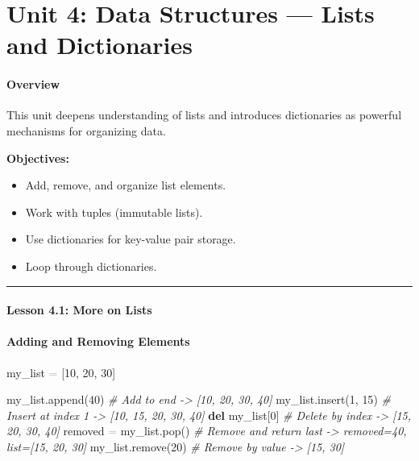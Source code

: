 \documentclass[
  justified,
  openright,
]{tufte-book}
\let\subsection\paragraph
\let\paragraph\paragraph
\newcommand{\KeywordTok}[1]{\textcolor{CodeKeyword}{\textbf{#1}}}  %
\newcommand{\CommentTok}[1]{\textcolor{CodeComment}{\textit{#1}}}  %
\newcommand{\CodeNumTok}[1]{\textcolor{CodeNumber}{#1}}             %
\newcommand{\OperatorTok}[1]{\textcolor{DarkGray}{#1}}              %
\newenvironment{Shaded}{%
  \begin{mdframed}[style=TufteCode]%
}{%
  \end{mdframed}%
}
\let\subsection\paragraph
\let\paragraph\paragraph
\providecommand{\tightlist}{%
  \setlength{\itemsep}{0pt}\setlength{\parskip}{0pt}}
\begin{document}
\newpage

\section{Unit 4: Data Structures --- Lists and
Dictionaries}\label{unit-4-data-structures-lists-and-dictionaries-1}

\subsection{Overview}\label{overview-4}

This unit deepens understanding of lists and introduces dictionaries as
powerful mechanisms for organizing data.

\textbf{Objectives:}

\begin{itemize}
\tightlist
\item
  Add, remove, and organize list elements.
\item
  Work with tuples (immutable lists).
\item
  Use dictionaries for key-value pair storage.
\item
  Loop through dictionaries.
\end{itemize}

\begin{center}\rule{0.5\linewidth}{0.5pt}\end{center}

\subsection{Lesson 4.1: More on Lists}\label{lesson-4.1-more-on-lists}

\subsection{Adding and Removing
Elements}\label{adding-and-removing-elements}

\begin{Shaded}
\begin{Highlighting}[]
my\_list \OperatorTok{=} [\CodeNumTok{10}, \CodeNumTok{20}, \CodeNumTok{30}]
 
my\_list.append(\CodeNumTok{40})          \CommentTok{\# Add to end {-}\textgreater{} [10, 20, 30, 40]}
my\_list.insert(\CodeNumTok{1}, \CodeNumTok{15})       \CommentTok{\# Insert at index 1 {-}\textgreater{} [10, 15, 20, 30, 40]}
\KeywordTok{del} my\_list[\CodeNumTok{0}]              \CommentTok{\# Delete by index {-}\textgreater{} [15, 20, 30, 40]}
removed \OperatorTok{=} my\_list.pop()     \CommentTok{\# Remove and return last {-}\textgreater{} removed=40, list=[15, 20, 30]}
my\_list.remove(\CodeNumTok{20})          \CommentTok{\# Remove by value {-}\textgreater{} [15, 30]}
\end{Highlighting}
\end{Shaded}
\end{document}

